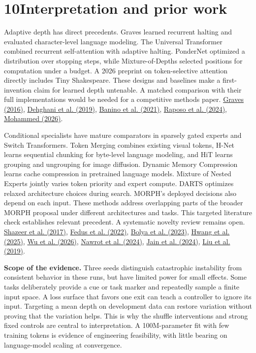 \documentclass[11pt,letterpaper]{article}
\newcommand{\topic}[1]{\par\medskip\noindent\textbf{#1}\enspace}
\newcommand{\source}[2]{\href{#1}{#2}}
\begin{document}
\section*{10\quad Interpretation and prior work}
Adaptive depth has direct precedents. Graves learned recurrent halting and evaluated character-level language modeling. The Universal Transformer combined recurrent self-attention with adaptive halting. PonderNet optimized a distribution over stopping steps, while Mixture-of-Depths selected positions for computation under a budget. A 2026 preprint on token-selective attention directly includes Tiny Shakespeare. These designs and baselines make a first-invention claim for learned depth untenable. A matched comparison with their full implementations would be needed for a competitive methods paper. \source{https://arxiv.org/abs/1603.08983}{Graves (2016)}, \source{https://arxiv.org/abs/1807.03819}{Dehghani et al. (2019)}, \source{https://arxiv.org/abs/2107.05407}{Banino et al. (2021)}, \source{https://arxiv.org/abs/2404.02258}{Raposo et al. (2024)}, \source{https://arxiv.org/abs/2605.05222}{Mohammed (2026)}.

Conditional specialists have mature comparators in sparsely gated experts and Switch Transformers. Token Merging combines existing visual tokens, H-Net learns sequential chunking for byte-level language modeling, and HiT learns grouping and ungrouping for image diffusion. Dynamic Memory Compression learns cache compression in pretrained language models. Mixture of Nested Experts jointly varies token priority and expert compute. DARTS optimizes relaxed architecture choices during search. MORPH's deployed decisions also depend on each input. These methods address overlapping parts of the broader MORPH proposal under different architectures and tasks. This targeted literature check establishes relevant precedent. A systematic novelty review remains open. \source{https://arxiv.org/abs/1701.06538}{Shazeer et al. (2017)}, \source{https://arxiv.org/abs/2101.03961}{Fedus et al. (2022)}, \source{https://arxiv.org/abs/2210.09461}{Bolya et al. (2023)}, \source{https://arxiv.org/abs/2507.07955}{Hwang et al. (2025)}, \source{https://arxiv.org/abs/2611.22962}{Wu et al. (2026)}, \source{https://arxiv.org/abs/2403.09636}{Nawrot et al. (2024)}, \source{https://arxiv.org/abs/2407.19985}{Jain et al. (2024)}, \source{https://arxiv.org/abs/1806.09055}{Liu et al. (2019)}.

\topic{Scope of the evidence.} Three seeds distinguish catastrophic instability from consistent behavior in these runs, but have limited power for small effects. Some tasks deliberately provide a cue or task marker and repeatedly sample a finite input space. A loss surface that favors one exit can teach a controller to ignore its input. Targeting a mean depth on development data can restore variation without proving that the variation helps. This is why the shuffle interventions and strong fixed controls are central to interpretation. A 100M-parameter fit with few training tokens is evidence of engineering feasibility, with little bearing on language-model scaling at convergence.
\end{document}
